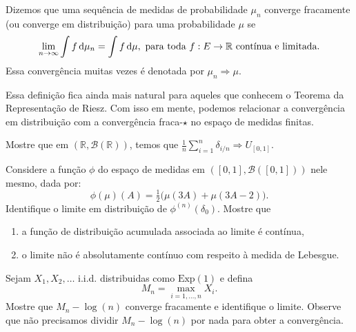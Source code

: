 \begin{definition}
  Dizemos que uma sequência de medidas de probabilidade $\mu_n$ converge fracamente (ou converge em distribuição) para uma probabilidade $\mu$ se 
  \begin{equation}
    \lim_{n \to \infty} \int f \mathop{}\!\mathrm{d} \mu_n = \int f \mathop{}\!\mathrm{d} \mu, \text{ para toda $f:E \to \mathbb{R}$ contínua e limitada.}
  \end{equation}
  Essa convergência muitas vezes é denotada por $\mu_n \Rightarrow \mu$.
\end{definition}

Essa definição fica ainda mais natural para aqueles que conhecem o Teorema da Representação de Riesz.
Com isso em mente, podemos relacionar a convergência em distribuição com a convergência fraca-$\star$ no espaço de medidas finitas.

\begin{exercise}
  Mostre que em $(\mathbb{R}, \mathcal{B}(\mathbb{R}))$, temos que $\tfrac{1}{n} \sum_{i=1}^n \delta_{i/n} \Rightarrow U_{[0,1]}$.
\end{exercise}

\begin{exercise}
  Considere a função $\phi$ do espaço de medidas em $([0,1], \mathcal{B}([0,1]))$ nele mesmo, dada por:
  \begin{equation}
    \phi(\mu)(A) = \tfrac{1}{2} \big( \mu(3A) + \mu(3A - 2) \big).
  \end{equation}
  Identifique o limite em distribuição de $\phi^{(n)}(\delta_0)$.
  Mostre que
  \begin{enumerate}[\quad a)]
  \item a função de distribuição acumulada associada ao limite é contínua,
  \item o limite não é absolutamente contínuo com respeito à medida de Lebesgue.
  \end{enumerate}
\end{exercise}

\begin{exercise}
  Sejam $X_1, X_2, \dots$ i.i.d. distribuidas como $\text{Exp}(1)$ e defina
  \begin{equation}
    M_n = \max_{i = 1, \dots, n} X_i.
  \end{equation}
  Mostre que $M_n - \log(n)$ converge fracamente e identifique o limite.
  Observe que não precisamos dividir $M_n - \log(n)$ por nada para obter a convergência.
\end{exercise}


